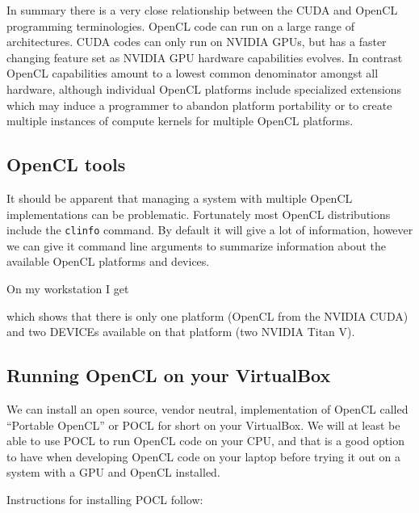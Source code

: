 In summary there is a very close relationship between the CUDA and OpenCL programming terminologies. OpenCL code can run on a large range of architectures. CUDA codes can only run on NVIDIA GPUs, but has a faster changing feature set as NVIDIA GPU hardware capabilities evolves. In contrast OpenCL capabilities amount to a lowest common denominator amongst all hardware, although individual OpenCL platforms include specialized extensions which may induce a programmer to abandon platform portability or to create multiple instances of compute kernels for multiple OpenCL platforms.

\subsection{OpenCL tools}

It should be apparent that managing a system with multiple OpenCL implementations can be problematic. Fortunately most OpenCL distributions include the \texttt{clinfo} command. By default it will give a lot of information, however we can give it command line arguments to summarize information about the available OpenCL platforms and devices. 

On my workstation I get


which shows that there is only one platform (OpenCL from the NVIDIA CUDA) and two DEVICEs available on that platform (two NVIDIA Titan V).

\subsection{Running OpenCL on your VirtualBox}

We can install an open source, vendor neutral, implementation of OpenCL called ``Portable OpenCL'' or POCL for short on your VirtualBox. We will at least be able to use POCL to run OpenCL code on your CPU, and that is a good option to have when developing OpenCL code on your laptop before trying it out on a system with a GPU and OpenCL installed.

Instructions for installing POCL follow:

